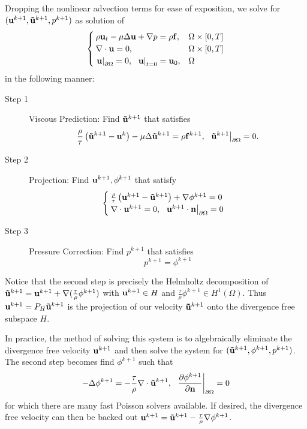 \documentclass[letterpaper]{erdc}
\begin{document}
Dropping the nonlinear advection terms for ease of exposition, we solve for $(\textbf{u}^{k+1}, \mathbf{\tilde{u}}^{k+1}, p^{k+1})$ as solution of 
\begin{equation}
\begin{cases}
  \rho\textbf{u}_t - \mu\Delta\textbf{u} + \nabla p = \rho\mathbf{f},& \Omega\times[0,T]\\
  \nabla\cdot \textbf{u} = 0,& \Omega\times[0,T]\\
  \left.\textbf{u}\right|_{\partial\Omega} = 0,\hspace{2mm} \left.\textbf{u}\right|_{t=0} = \textbf{u}_0,& \Omega
\end{cases}
\end{equation}
in the following manner:
\begin{description}
  \item[Step 1] Viscous Prediction:  Find $\mathbf{\tilde{u}}^{k+1}$ that satisfies
  \begin{equation}
    \frac{\rho}{\tau}\left(\mathbf{\tilde{u}}^{k+1} - \textbf{u}^{k} \right) - \mu \Delta \mathbf{\tilde{u}}^{k+1} = \rho\mathbf{f}^{k+1},  \hspace{2mm} \left.\mathbf{\tilde{u}}^{k+1}\right|_{\partial\Omega} = 0.
  \end{equation}
  
  \item[Step 2] Projection:  Find $\textbf{u}^{k+1}, \phi^{k+1}$ that satisfy
  \begin{equation}
    \begin{cases}
    \frac{\rho}{\tau}\left(\textbf{u}^{k+1} - \mathbf{\tilde{u}}^{k+1} \right) + \nabla \phi^{k+1} = 0 \\
    \nabla\cdot \textbf{u}^{k+1} = 0, \hspace{2mm} \left.\textbf{u}^{k+1}\cdot\textbf{n} \right|_{\partial\Omega} = 0
    \end{cases}
  \end{equation}
  
  \item[Step 3] Pressure Correction: Find $p^{k+1}$ that satisfies
  \begin{equation}
    p^{k+1} = \phi^{k+1}
  \end{equation} 
\end{description}

Notice that the second step is precisely the Helmholtz decomposition of $\mathbf{\tilde{u}}^{k+1} = \textbf{u}^{k+1} + \nabla(\frac{\tau}{\rho} \phi^{k+1})$ with $\textbf{u}^{k+1}\in H$ and $\frac{\tau}{\rho}\phi^{k+1}\in H^1(\Omega)$.  Thus $\textbf{u}^{k+1} = P_{H}\mathbf{\tilde{u}}^{k+1}$ is the projection of our velocity $\mathbf{\tilde{u}}^{k+1}$ onto the divergence free subspace $H$.

In practice, the method of solving this system is to algebraically eliminate the divergence free velocity $\textbf{u}^{k+1}$ and then solve the system for $(\mathbf{\tilde{u}}^{k+1},\phi^{k+1}, p^{k+1})$.  The second step becomes find $\phi^{k+1}$ such that
\begin{equation}
  -\Delta\phi^{k+1} = -\frac{\tau}{\rho} \nabla\cdot \mathbf{\tilde{u}}^{k+1}, \hspace{2mm} \left.\frac{\partial \phi^{k+1}}{\partial\textbf{n}}\right|_{\partial\Omega} = 0
\end{equation}
for which there are many fast Poisson solvers available. If desired, the divergence free velocity can then be backed out $\textbf{u}^{k+1} = \mathbf{\tilde{u}}^{k+1} -\frac{\tau}{\rho} \nabla\phi^{k+1}$.
\end{document}
